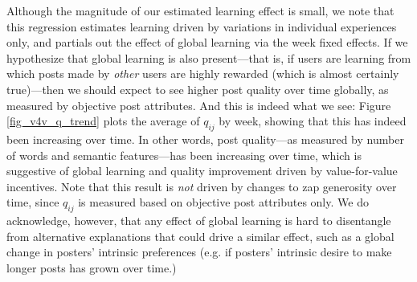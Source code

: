 Although the magnitude of our estimated learning effect is small, we note that this regression estimates learning driven by variations in individual experiences only, and partials out the effect of global learning via the week fixed effects. If we hypothesize that global learning is also present---that is, if users are learning from which posts made by \emph{other} users are highly rewarded (which is almost certainly true)---then we should expect to see higher post quality over time globally, as measured by objective post attributes. And this is indeed what we see: Figure \ref{fig_v4v_q_trend} plots the average of $q_{ij}$ by week, showing that this has indeed been increasing over time. In other words, post quality---as measured by number of words and semantic features---has been increasing over time, which is suggestive of global learning and quality improvement driven by value-for-value incentives.  Note that this result is \emph{not} driven by changes to zap generosity over time, since $q_{ij}$ is measured based on objective post attributes only.  We do acknowledge, however, that any effect of global learning is hard to disentangle from alternative explanations that could drive a similar effect, such as a global change in posters' intrinsic preferences (e.g. if posters' intrinsic desire to make longer posts has grown over time.)

